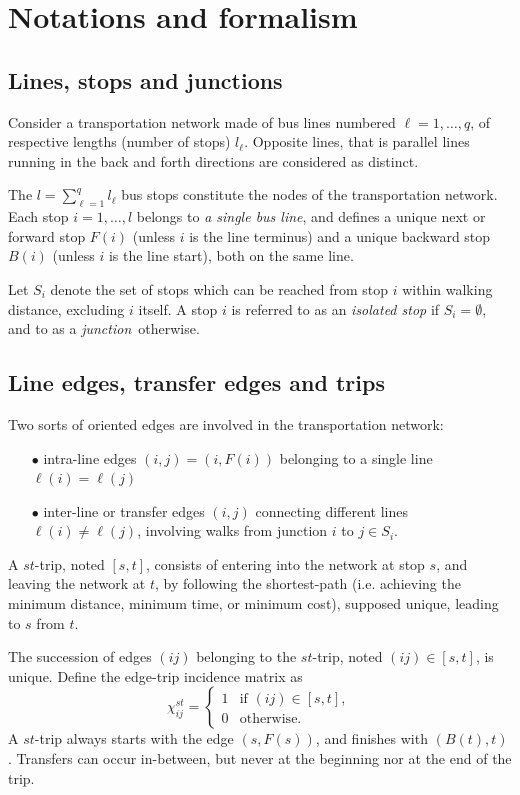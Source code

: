 \documentclass{bmcart}
\begin{document}
\section{Notations and formalism}
\subsection{Lines, stops  and junctions}
\label{Lines and junctions}
Consider a transportation network made of bus lines numbered $\ell=1,\ldots, q$, of respective lengths (number of stops) $l_\ell$.  Opposite lines, that is parallel lines running in the back and forth directions are considered as distinct. 

The $l=\sum_{\ell=1}^ql_\ell$ bus stops constitute the nodes of the transportation network. Each stop $i=1,\ldots,l$ belongs to {\em  a single bus line}, and defines a unique next or forward stop $F(i)$ (unless $i$ is the line terminus) and a unique backward stop $B(i)$ (unless $i$ is the line start), both on the same line.  

Let $S_i$ denote the set of stops which can be reached from stop $i$ within walking distance, excluding $i$ itself. A stop $i$ is referred to as an {\em isolated stop} if $S_i=\emptyset$, and to as a {\em junction} otherwise. 


\subsection{Line edges, transfer edges and trips}
\label{Line edges, transfer edges and trips}
Two sorts of oriented edges are involved in the transportation network: 
\begin{enumerate}
  \item[$\bullet$] intra-line edges $(i,j)=(i,F(i))$ belonging to a single line  $\ell(i)=\ell(j)$
  \item[$\bullet$] inter-line or transfer edges $(i,j)$ connecting different lines $\ell(i)\neq \ell(j)$, involving walks from junction $i$ to $j\in S_i$.
  \end{enumerate}
A $st$-trip, noted $[s,t]$, consists of entering into the network at stop $s$, and leaving the network at $t$, by following the shortest-path (i.e. achieving the minimum distance,  minimum time, or  minimum cost), supposed unique, leading to $s$ from $t$. 

The succession of edges $(ij)$ belonging to the $st$-trip, noted $(ij)\in [s,t]$, is unique. Define the edge-trip incidence matrix as
\begin{equation}
\label{edgetrip}
\chi_{ij}^{st} = \begin{cases}
  1    & \text{if $(ij)\in [s,t]$}, \\
  0    & \text{otherwise}.
\end{cases}
\end{equation}
A $st$-trip always starts with the edge $(s,F(s))$, and finishes with $(B(t),t)$. Transfers can occur in-between, but never at the beginning nor at the end of the trip. 
\end{document}
